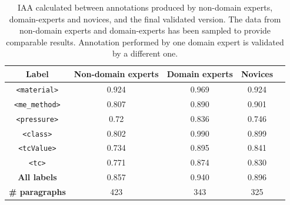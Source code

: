 \documentclass[fleqn,10pt]{wlscirep}
\begin{document}
\begin{table}[ht]
    \centering
    \begin{tabular}{ | c | c | c | c | c | } 
    \hline
        \textbf{Label} & \textbf{Non-domain experts} & \textbf{Domain experts} & \textbf{Novices}\\
    \hline
        \texttt{<material>}     &   0.924   &   0.969   &   0.924   \\
        \texttt{<me\_method>}   &	0.807   &	0.890   &   0.901   \\
        \texttt{<pressure>}     &	0.72    &	0.836   &   0.746   \\
        \texttt{<class>}        &	0.802	&   0.990   &   0.899   \\
        \texttt{<tcValue>}      &	0.734	&   0.895   &   0.841   \\
        \texttt{<tc>}           &	0.771	&   0.874   &   0.830   \\
    \hline
        \textbf{All labels}        &	0.857	&   0.940   &   0.896   \\
    \hline
        \textbf{\# paragraphs}  &	423	    &   343     &   325     \\
    \hline
    \end{tabular}
    \caption{IAA calculated between annotations produced by non-domain experts, domain-experts and novices, and the final validated version. The data from non-domain experts and domain-experts has been sampled to provide comparable results. Annotation performed by one domain expert is validated by a different one. }
    \label{table:comparison-iaa-nde-de}
\end{table}
\end{document}
